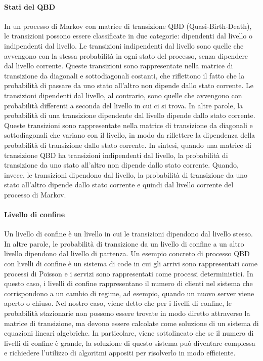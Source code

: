 \documentclass[11pt]{article}
\begin{document}
\paragraph{Stati del QBD} In un processo di Markov con matrice di transizione QBD (Quasi-Birth-Death), le transizioni possono essere classificate in due categorie: dipendenti dal livello o indipendenti dal livello. Le transizioni indipendenti dal livello sono quelle che avvengono con la stessa probabilità in ogni stato del processo, senza dipendere dal livello corrente. Queste transizioni sono rappresentate nella matrice di transizione da diagonali e sottodiagonali costanti, che riflettono il fatto che la probabilità di passare da uno stato all'altro non dipende dallo stato corrente. Le transizioni dipendenti dal livello, al contrario, sono quelle che avvengono con probabilità differenti a seconda del livello in cui ci si trova. In altre parole, la probabilità di una transizione dipendente dal livello dipende dallo stato corrente. Queste transizioni sono rappresentate nella matrice di transizione da diagonali e sottodiagonali che variano con il livello, in modo da riflettere la dipendenza della probabilità di transizione dallo stato corrente. In sintesi, quando una matrice di transizione QBD ha transizioni indipendenti dal livello, la probabilità di transizione da uno stato all'altro non dipende dallo stato corrente. Quando, invece, le transizioni dipendono dal livello, la probabilità di transizione da uno stato all'altro dipende dallo stato corrente e quindi dal livello corrente del processo di Markov. \\

\paragraph{Livello di confine} Un livello di confine è un livello in cui le transizioni dipendono dal livello stesso. In altre parole, le probabilità di transizione da un livello di confine a un altro livello dipendono dal livello di partenza. Un esempio concreto di processo QBD con livelli di confine è un sistema di code in cui gli arrivi sono rappresentati come processi di Poisson e i servizi sono rappresentati come processi deterministici. In questo caso, i livelli di confine rappresentano il numero di clienti nel sistema che corrispondono a un cambio di regime, ad esempio, quando un nuovo server viene aperto o chiuso. Nel nostro caso, viene detto che per i livelli di confine, le probabilità stazionarie non possono essere trovate in modo diretto attraverso la matrice di transizione, ma devono essere calcolate come soluzione di un sistema di equazioni lineari algebriche. In particolare, viene sottolineato che se il numero di livelli di confine è grande, la soluzione di questo sistema può diventare complessa e richiedere l'utilizzo di algoritmi appositi per risolverlo in modo efficiente. \\
\end{document}
